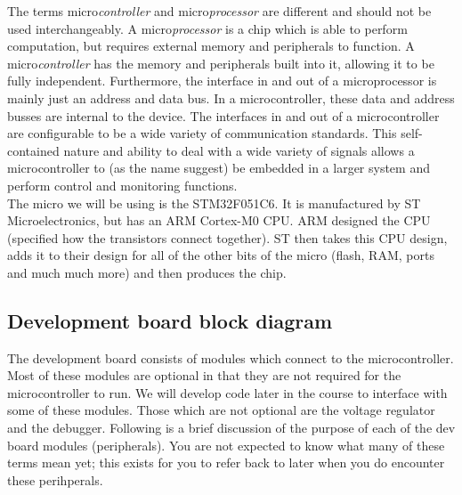 \begin{table}
\caption{Comparison of specs of entry level computer to STM32F051C6.}
\label{table:specs_comp}
\end{table}

The terms micro\textit{controller} and micro\textit{processor} are different and should not be used interchangeably. A micro\textit{processor} is a chip which is able to perform computation, but requires external memory and peripherals to function. A micro\textit{controller} has the memory and peripherals built into it, allowing it to be fully independent. Furthermore, the interface in and out of a microprocessor is mainly just an address and data bus. In a microcontroller, these data and address busses are internal to the device. The interfaces in and out of a microcontroller are configurable to be a wide variety of communication standards. This self-contained nature and ability to deal with a wide variety of signals allows a microcontroller to (as the name suggest) be embedded in a larger system and perform control and monitoring functions.\\

The micro we will be using is the STM32F051C6. It is manufactured by ST Microelectronics, but has an ARM Cortex-M0 CPU. ARM designed the CPU (specified how the transistors connect together). ST then takes this CPU design, adds it to their design for all of the other bits of the micro (flash, RAM, ports and much much more) and then produces the chip.

\subsection{Development board block diagram}
The development board consists of modules which connect to the microcontroller. Most of these modules are optional in that they are not required for the microcontroller to run. We will develop code later in the course to interface with some of these modules. Those which are not optional are the voltage regulator and the debugger.
Following is a brief discussion of the purpose of each of the dev board modules (peripherals). You are not expected to know what many of these terms mean yet; this exists for you to refer back to later when you do encounter these perihperals. 

